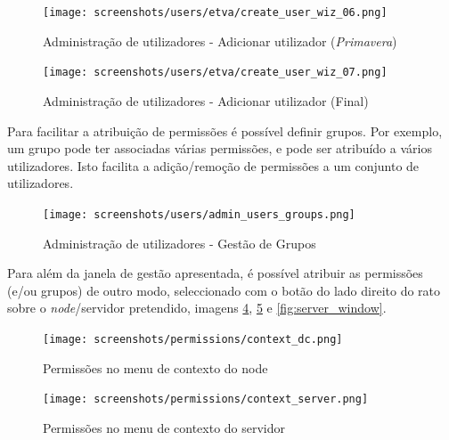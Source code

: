 {\begin{figure}[H]
        \begin{center}
        \texttt{[image: screenshots/users/etva/create\_user\_wiz\_06.png]}
        \caption{Administração de utilizadores - Adicionar utilizador (\textit{Primavera})}
        \label{fig:create_user_wiz_06}
        \end{center}
\end{figure}

\begin{figure}[H]
        \begin{center}
        \texttt{[image: screenshots/users/etva/create\_user\_wiz\_07.png]}
        \caption{Administração de utilizadores - Adicionar utilizador (Final)}
        \label{fig:create_user_wiz_07}
        \end{center}
\end{figure}

}

Para facilitar a atribuição de permissões é possível definir grupos. Por exemplo, um grupo pode ter associadas várias permissões, e pode ser atribuído a vários utilizadores. Isto facilita a adição/remoção de permissões a um conjunto de utilizadores.

\begin{figure}[H]
        \begin{center}
        \texttt{[image: screenshots/users/admin\_users\_groups.png]}
        \caption{Administração de utilizadores - Gestão de Grupos}
        \label{fig:admin_users_groups}
        \end{center}
\end{figure}

Para além da janela de gestão apresentada, é possível atribuir as permissões (e/ou grupos) de outro modo, seleccionado com o botão do lado direito do rato sobre o \textit{node}/servidor pretendido, imagens \ref{fig:context_dc}, \ref{fig:context_server} e \ref{fig:server_window}.

\begin{figure}[H]
        \begin{center}
        \texttt{[image: screenshots/permissions/context\_dc.png]}
        \caption{Permissões no menu de contexto do node}
        \label{fig:context_dc}
        \end{center}
\end{figure}

\begin{figure}[H]
        \begin{center}
        \texttt{[image: screenshots/permissions/context\_server.png]}
        \caption{Permissões no menu de contexto do servidor}
        \label{fig:context_server}
        \end{center}
\end{figure}

